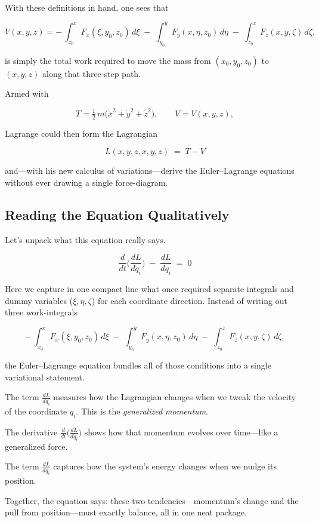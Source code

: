 \medskip

With these definitions in hand, one sees that

\[
V(x,y,z)
=
-\,\int_{x_0}^{x}F_x(\xi,y_0,z_0)\,d\xi
\;-\;
\int_{y_0}^{y}F_y(x,\eta,z_0)\,d\eta
\;-\;
\int_{z_0}^{z}F_z(x,y,\zeta)\,d\zeta,
\]

is simply the total work required to move the mass from \((x_0,y_0,z_0)\) to \((x,y,z)\) along that three‐step path.  

Armed with

\[
T=\tfrac12\,m\bigl(\dot x^2+\dot y^2+\dot z^2\bigr),
\qquad
V=V(x,y,z),
\]

Lagrange could then form the Lagrangian 

\[
L(x,y,z,\dot x,\dot y,\dot z)\;=\;T-V
\]

and—with his new calculus of variations—derive the Euler–Lagrange equations without ever drawing a single force-diagram.

\subsection{Reading the Equation Qualitatively}

Let’s unpack what this equation really says.

\[
\frac{d}{dt} \biggl( \frac{dL}{d\dot{q}_i} \biggr) \;-\;\frac{dL}{dq_i} \;=\; 0
\]

Here we capture in one compact line what once required separate integrals and dummy variables (\(\xi,\eta,\zeta\)) for each coordinate direction.  Instead of writing out three work‐integrals

\[
-\,\int_{x_0}^{x}F_x(\xi,y_0,z_0)\,d\xi
\;-\;
\int_{y_0}^{y}F_y(x,\eta,z_0)\,d\eta
\;-\;
\int_{z_0}^{z}F_z(x,y,\zeta)\,d\zeta,
\]

the Euler–Lagrange equation bundles all of those conditions into a single variational statement.

The term \(\displaystyle \frac{dL}{d\dot{q}_i}\) measures how the Lagrangian changes when we tweak the velocity of the coordinate \(q_i\).  This is the \emph{generalized momentum}.

The derivative \(\displaystyle \frac{d}{dt}\!\bigl(\tfrac{dL}{d\dot{q}_i}\bigr)\) shows how that momentum evolves over time—like a generalized force.

The term \(\displaystyle \frac{dL}{dq_i}\) captures how the system’s energy changes when we nudge its position.

Together, the equation says: these two tendencies—momentum’s change and the pull from position—must exactly balance, all in one neat package.

